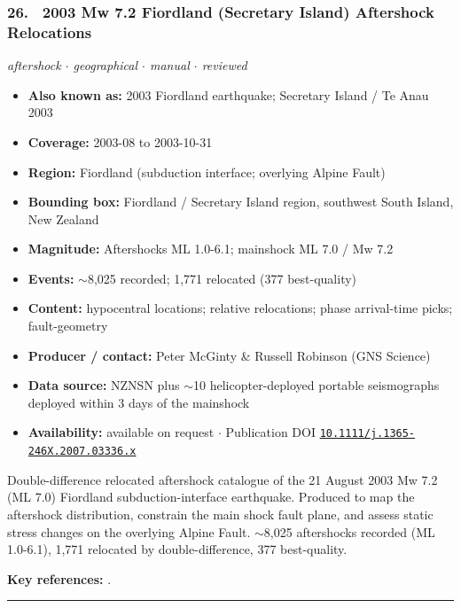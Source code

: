 \documentclass[10pt,a4paper]{article}
\newcommand{\catentryrule}{\par\vspace{3pt}\noindent\textcolor{rulegrey}{\rule{\linewidth}{0.3pt}}\par\vspace{5pt}}
\newcommand{\kv}[2]{\item \textbf{#1:} #2}
\begin{document}
\subsubsection*{\hypertarget{c:26}{26.}~ 2003 Mw 7.2 Fiordland (Secretary Island) Aftershock Relocations}
{\small\itshape aftershock $\cdot$ geographical $\cdot$ manual $\cdot$ reviewed}\par\vspace{2pt}
\begin{itemize}[leftmargin=1.3em,itemsep=0.6pt,topsep=1pt,parsep=0pt]
\kv{Also known as}{2003 Fiordland earthquake; Secretary Island / Te Anau 2003}
\kv{Coverage}{2003-08 to 2003-10-31}
\kv{Region}{Fiordland (subduction interface; overlying Alpine Fault)}
\kv{Bounding box}{Fiordland / Secretary Island region, southwest South Island, New Zealand}
\kv{Magnitude}{Aftershocks ML 1.0-6.1; mainshock ML 7.0 / Mw 7.2}
\kv{Events}{$\sim$8,025 recorded; 1,771 relocated (377 best-quality)}
\kv{Content}{hypocentral locations; relative relocations; phase arrival-time picks; fault-geometry}
\kv{Producer / contact}{Peter McGinty \& Russell Robinson (GNS Science)}
\kv{Data source}{NZNSN plus $\sim$10 helicopter-deployed portable seismographs deployed within 3 days of the mainshock}
\kv{Availability}{available on request $\cdot$ Publication DOI \href{https://doi.org/10.1111/j.1365-246X.2007.03336.x}{\nolinkurl{10.1111/j.1365-246X.2007.03336.x}}}
\end{itemize}
\par\vspace{2pt}Double-difference relocated aftershock catalogue of the 21 August 2003 Mw 7.2 (ML 7.0) Fiordland subduction-interface earthquake. Produced to map the aftershock distribution, constrain the main shock fault plane, and assess static stress changes on the overlying Alpine Fault. $\sim$8,025 aftershocks recorded (ML 1.0-6.1), 1,771 relocated by double-difference, 377 best-quality.
\par\vspace{2pt}\textbf{Key references:} \cite{McGinty2007}.
\catentryrule
\end{document}
